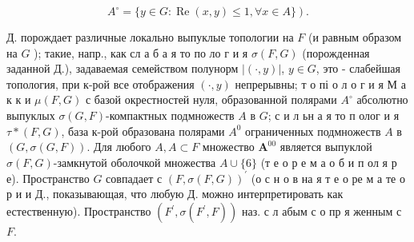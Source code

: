 \documentclass[10pt]{article}
\begin{document}
\[

\left.A^{\circ}=\{y \in G: \operatorname{Re}(x, y) \leqslant 1, \forall x \in A\}\right) .

\]



Д. порождает различные локально выпуклые топологии на $F$ (и равным образом на $G$ ); такие, напр., как сл а б а я то по ло г и я $\sigma(F, G)$ (порожденная заданной Д.), задаваемая семейством полунорм $|(\cdot, y)|$, $y \in G$, это - слабейшая топология, при к-рой все отображения $(\cdot, y)$ непрерывны; т о пі о л о г и я М а к к и $\mu(F, G)$ с базой окрестностей нуля, образованной полярами $A^{\circ}$ абсолютно выпуклых $\sigma(G, F)$-компактных подмножеств $A$ в $G$; с и л ьн а я то п олог и я $\tau *(F, G)$, база к-рой образована полярами $A^{0}$ ограниченных подмножеств $A$ в $(G, \sigma(G, F))$. Для любого $A, A \subset F$ множество $\boldsymbol{A}^{00}$ является выпуклой $\sigma(F, G)$-замкнутой оболочкой множества $A \cup\{6\}$ (т е о р е м а о б и п ол я р е). Пространство $G$ совпадает с $(F, \sigma(F, G))^{\prime}$ (о с н о в на я т е о ре м а те о р и и Д., показывающая, что любую Д. можно интерпретировать как естественную). Пространство $\left(F^{\prime}, \sigma\left(F^{\prime}, F\right)\right)$ наз. с л абым с о пр я женным с $F$.
\end{document}
